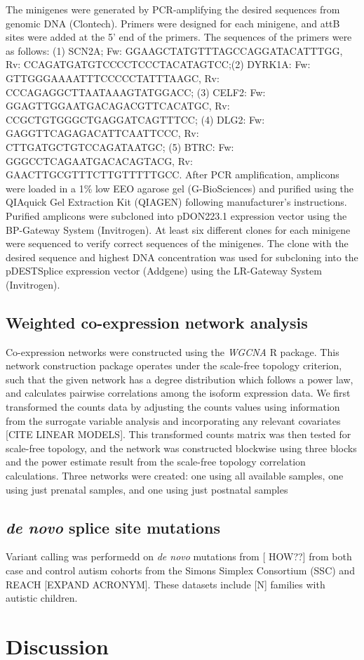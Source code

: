 The minigenes were generated by PCR-amplifying the desired sequences from genomic DNA (Clontech). Primers were designed for each minigene, and attB sites were added at the 5’ end of the primers. The sequences of the primers were as follows: (1) SCN2A; Fw: GGAAGCTATGTTTAGCCAGGATACATTTGG, Rv: CCAGATGATGTCCCCTCCCTACATAGTCC;(2) DYRK1A: Fw: GTTGGGAAAATTTCCCCCTATTTAAGC, Rv: CCCAGAGGCTTAATAAAGTATGGACC; (3) CELF2: Fw: GGAGTTGGAATGACAGACGTTCACATGC, Rv: CCGCTGTGGGCTGAGGATCAGTTTCC; (4) DLG2: Fw: GAGGTTCAGAGACATTCAATTCCC, Rv: CTTGATGCTGTCCAGATAATGC; (5) BTRC: Fw: GGGCCTCAGAATGACACAGTACG, Rv: GAACTTGCGTTTCTTGTTTTTGCC. After PCR amplification, amplicons were loaded in a 1\% low EEO agarose gel (G-BioSciences) and purified using the QIAquick Gel Extraction Kit (QIAGEN) following manufacturer’s instructions. Purified amplicons were subcloned into pDON223.1 expression vector using the BP-Gateway System (Invitrogen). At least six different clones for each minigene were sequenced to verify correct sequences of the minigenes. The clone with the desired sequence and highest DNA concentration was used for subcloning into the pDESTSplice expression vector (Addgene) using the LR-Gateway System (Invitrogen).

\subsection{Weighted co-expression network analysis}
Co-expression networks were constructed using the \textit{WGCNA} R package. This network construction package operates under the scale-free topology criterion, such that the given network has a degree distribution which follows a power law, and calculates pairwise correlations among the isoform expression data. We first transformed the counts data by adjusting the counts values using information from the surrogate variable analysis and incorporating any relevant covariates [CITE LINEAR MODELS]. This transformed counts matrix was then tested for scale-free topology, and the network was constructed blockwise using three blocks and the power estimate result from the scale-free topology correlation calculations. Three networks were created: one using all available samples, one using just prenatal samples, and one using just postnatal samples

\subsection{\textit{de novo} splice site mutations}
Variant calling was performedd on \textit{de novo} mutations from [	HOW??] from both case and control autism cohorts from the Simons Simplex Consortium (SSC) and REACH [EXPAND ACRONYM]. These datasets include [N] families with autistic children.

\section{Discussion}
